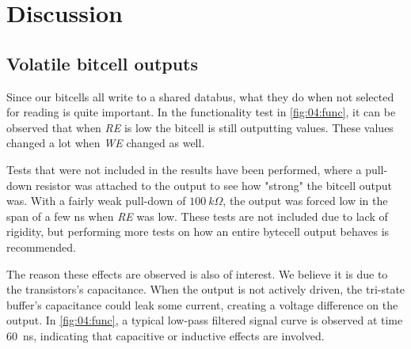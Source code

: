 \section{Discussion}    \label{sec:05:discussion}

\subsection{Volatile bitcell outputs}
Since our bitcells all write to a shared databus, what they do when not selected for reading is quite important. In the functionality test in \autoref{fig:04:func}, it can be observed that when \textit{RE} is low the bitcell is still outputting values. These values changed a lot when \textit{WE} changed as well.

Tests that were not included in the results have been performed, where a pull-down resistor was attached to the output to see how "strong" the bitcell output was. With a fairly weak pull-down of $\SI{100}{k\Omega}$, the output was forced low in the span of a few ns when \textit{RE} was low. These tests are not included due to lack of rigidity, but performing more tests on how an entire bytecell output behaves is recommended.

The reason these effects are observed is also of interest. We believe it is due to the transistors's capacitance. When the output is not actively driven, the tri-state buffer's capacitance could leak some current, creating a voltage difference on the output. In \autoref{fig:04:func}, a typical low-pass filtered signal curve is observed at time \SI{60}{ns}, indicating that capacitive or inductive effects are involved.

